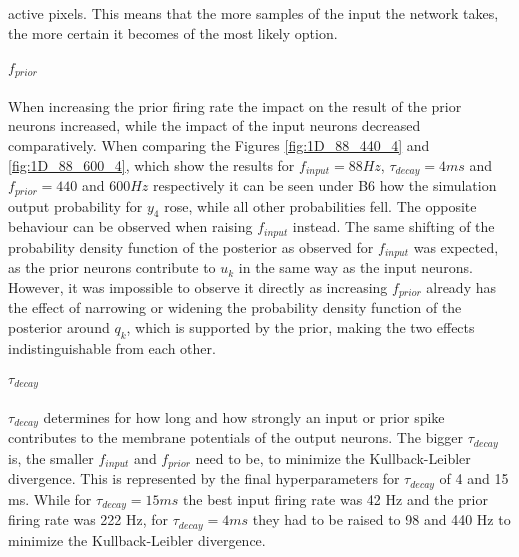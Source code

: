 active pixels. This means that the more samples of the input the network takes, the more certain it becomes of the most likely option.

\paragraph{$f_{prior}$} When increasing the prior firing rate the impact on the result of the prior neurons increased, while the impact of the input neurons decreased comparatively. When comparing the Figures \ref{fig:1D_88_440_4} and \ref{fig:1D_88_600_4}, which show the results for $f_{input} = 88 Hz$, $\tau_{decay} = 4 ms$ and $f_{prior} = 440$ and $600 Hz$ respectively it can be seen under B6 how the simulation output probability for $y_4$ rose, while all other probabilities fell. The opposite behaviour can be observed when raising $f_{input}$ instead. The same shifting of the probability density function of the posterior as observed for $f_{input}$ was expected, as the prior neurons contribute to $u_k$ in the same way as the input neurons. However, it was impossible to observe it directly as increasing $f_{prior}$ already has the effect of narrowing or widening the probability density function of the posterior around $q_k$, which is supported by the prior, making the two effects indistinguishable from each other.

\paragraph{$\tau_{decay}$} $\tau_{decay}$ determines for how long and how strongly an input or prior spike contributes to the membrane potentials of the output neurons. The bigger $\tau_{decay}$ is, the smaller $f_{input}$ and $f_{prior}$ need to be, to minimize the Kullback-Leibler divergence. This is represented by the final hyperparameters for $\tau_{decay}$ of 4 and 15 ms. While for $\tau_{decay} = 15 ms$ the best input firing rate was 42 Hz and the prior firing rate was 222 Hz, for $\tau_{decay} = 4 ms$ they had to be raised to 98 and 440 Hz to minimize the Kullback-Leibler divergence.

